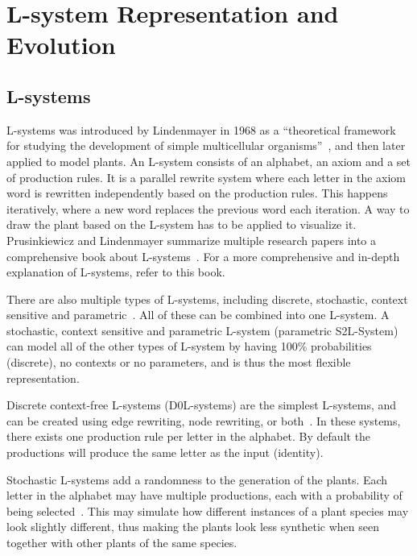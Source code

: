 \chapter{L-system Representation and Evolution}

\section{L-systems}
\glspl{L-system} was introduced by Lindenmayer in 1968 as a ``theoretical framework for studying the development of simple multicellular organisms''~\cite{2012Prusinkiewicz}, and then later applied to model plants.
An \gls{L-system} consists of an alphabet, an axiom and a set of production rules.
It is a parallel rewrite system where each letter in the axiom word is rewritten independently based on the production rules.
This happens iteratively, where a new word replaces the previous word each iteration.
A way to draw the plant based on the \gls{L-system} has to be applied to visualize it.
Prusinkiewicz and Lindenmayer summarize multiple research papers into a comprehensive book about \glspl{L-system}~\cite{2012Prusinkiewicz}.
For a more comprehensive and in-depth explanation of \glspl{L-system}, refer to this book.

There are also multiple types of \glspl{L-system}, including discrete, stochastic, context sensitive and parametric~\cite{2012Prusinkiewicz}.
All of these can be combined into one \gls{L-system}.
A stochastic, context sensitive and parametric \gls{L-system} (parametric S2L-System) can model all of the other types of \gls{L-system} by having 100\% probabilities (discrete), no contexts or no parameters, and is thus the most flexible representation.

Discrete context-free \glspl{L-system} (D0L-systems) are the simplest \glspl{L-system}, and can be created using edge rewriting, node rewriting, or both~\cite{2012Prusinkiewicz}.
In these systems, there exists one production rule per letter in the alphabet.
By default the productions will produce the same letter as the input (identity).

Stochastic \glspl{L-system} add a randomness to the generation of the plants.
Each letter in the alphabet may have multiple productions, each with a probability of being selected~\cite{2012Prusinkiewicz}.
This may simulate how different instances of a plant species may look slightly different, thus making the plants look less synthetic when seen together with other plants of the same species.

